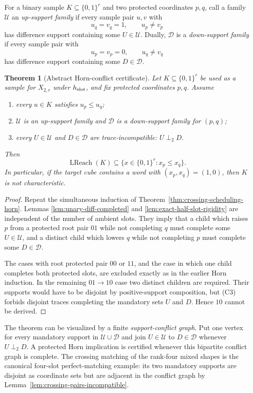 \documentclass[11pt]{article}
\newtheorem{theorem}[definition]{Theorem}
\begin{document}
For a binary sample $K\subseteq\{0,1\}^r$ and two protected coordinates
$p,q$, call a family $\mathcal U$ an \emph{up-support family} if every sample
pair $u,v$ with
\[
 u_q=v_q=1,\qquad u_p\ne v_p
\]
has difference support containing some $U\in\mathcal U$.  Dually,
$\mathcal D$ is a \emph{down-support family} if every sample pair with
\[
 u_p=v_p=0,\qquad u_q\ne v_q
\]
has difference support containing some $D\in\mathcal D$.

\begin{theorem}[Abstract Horn-conflict certificate]
\label{thm:abstract-horn-conflict}
Let $K\subseteq\{0,1\}^r$ be used as a sample for $X_{2,r}$ under
$h_{\rm slot}$, and fix protected coordinates $p,q$.  Assume
\begin{enumerate}[label=\textup{(C\arabic*)},leftmargin=*]
\item every $u\in K$ satisfies $u_p\le u_q$;
\item $\mathcal U$ is an up-support family and $\mathcal D$ is a
      down-support family for $(p,q)$;
\item every $U\in\mathcal U$ and $D\in\mathcal D$ are trace-incompatible:
      $U\perp_2 D$.
\end{enumerate}
Then
\[
 \boxed{
 \operatorname{LReach}(K)\subseteq\{x\in\{0,1\}^r:x_p\le x_q\}.
 }
\]
In particular, if the target cube contains a word with $(x_p,x_q)=(1,0)$,
then $K$ is not characteristic.
\end{theorem}

\begin{proof}
Repeat the simultaneous induction of
Theorem~\ref{thm:crossing-scheduling-horn}.  Lemmas
\ref{lem:unary-diff-completed} and \ref{lem:exact-half-slot-rigidity} are
independent of the number of ambient slots.  They imply that a child which
raises $p$ from a protected root pair $01$ while not completing $q$ must
complete some $U\in\mathcal U$, and a distinct child which lowers $q$ while
not completing $p$ must complete some $D\in\mathcal D$.

The cases with root protected pair $00$ or $11$, and the case in which one
child completes both protected slots, are excluded exactly as in the earlier
Horn induction.  In the remaining $01\to10$ case two distinct children are
required.  Their supports would have to be disjoint by positive-support
composition, but (C3) forbids disjoint traces completing the mandatory sets
$U$ and $D$.  Hence $10$ cannot be derived.
\end{proof}

The theorem can be visualized by a finite \emph{support-conflict graph}.  Put
one vertex for every mandatory support in $\mathcal U\cup\mathcal D$ and join
$U\in\mathcal U$ to $D\in\mathcal D$ whenever $U\perp_2 D$.  A protected Horn
implication is certified whenever this bipartite conflict graph is complete.
The crossing matching of the rank-four mixed shapes is the canonical four-slot
perfect-matching example: its two mandatory supports are disjoint as coordinate sets but are
adjacent in the conflict graph by
Lemma~\ref{lem:crossing-pairs-incompatible}.
\end{document}
